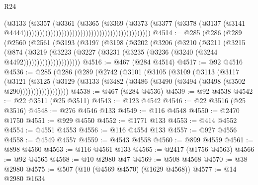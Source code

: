 \begin{lexlean}{R24}
\begin{coremodule}
{{{{{{{{{{{{{{{{{{{{{{{{{{{{{{{{{{{{{{{{{{{{{{{{{{{{{{{{{{{{{{{{{{{{{{{{{{{{{{{{{{{{{{{{{{{{{{{{{{{{{{{{{{{{{{{{{{{{{{{{{{{{{{{{{{{{{{{{{{{{{{{{{{{{{{{{{{{{{{{{{{{{{{{{{{{{{{{{{{{{{{{{{{{{{{{{{{{                                                                              (@3133
                                                                                (@3357
                                                                                  (@3361
                                                                                    (@3365
                                                                                      (@3369
                                                                                        (@3373
                                                                                          (@3377
                                                                                            (@3378
                                                                                              (@3137
                                                                                                (@3141
                                                                                                  @4444)))))))))))))))))))))))))))))))))))))))))))))))
@4514 := @285
    (@286
      (@289
        (@2560
          (@2561
            (@3193
              (@3197
                (@3198
                  (@3202
                    (@3206
                      (@3210
                        (@3211
                          (@3215
                            (@874
                              (@3219
                                (@3223
                                  (@3227
                                    (@3231 (@3235 (@3236 (@3240 (@3244 @4492)))))))))))))))))))))
@4516 := @467 (@284 @4514)
@4517 := @92 @4516
@4536 := @285
    (@286
      (@289
        (@2742
          (@3101
            (@3105
              (@3109
                (@3113
                  (@3117
                    (@3121
                      (@3125
                        (@3129
                          (@3133 (@3482 (@3486 (@3490 (@3494 (@3498 (@3502 @290))))))))))))))))))
@4538 := @467 (@284 @4536)
@4539 := @92 @4538
@4542 := @22 @3511 (@25 @3511)
@4543 := @123 @4542
@4546 := @22 @3516 (@25 @3516)
@4548 := @276 @4546 @133
@4549 := @116 @4548
@4550 := @2470 @1750
@4551 := @929 @4550
@4552 := @1771 @133
@4553 := @414 @4552
@4554 := @4551 @4553
@4556 := @116 @4554 @133
@4557 := @927 @4556
@4558 := @4549 @4557
@4559 := @4543 @4558
@4560 := @899 @4559
@4561 := @898 @4560
@4563 := @116 @4561 @133
@4565 := @2417 (@1756 @4563)
@4566 := @92 @4565
@4568 := @10 @2980 @47
@4569 := @508 @4568
@4570 := @38 @2980
@4575 := @507 (@10 (@4569 @4570) (@1629 @4568))
@4577 := @14 @2980 @1634
}}}}}}}}}}}}}}}}}}}}}}}}}}}}}}}}}}}}}}}}}}}}}}}}}}}}}}}}}}}}}}}}}}}}}}}}}}}}}}}}}}}}}}}}}}}}}}}}}}}}}}}}}}}}}}}}}}}}}}}}}}}}}}}}}}}}}}}}}}}}}}}}}}}}}}}}}}}}}}}}}}}}}}}}}}}}}}}}}}}}}}}}}}}}}}}}}}}
\end{coremodule}
\end{lexlean}
